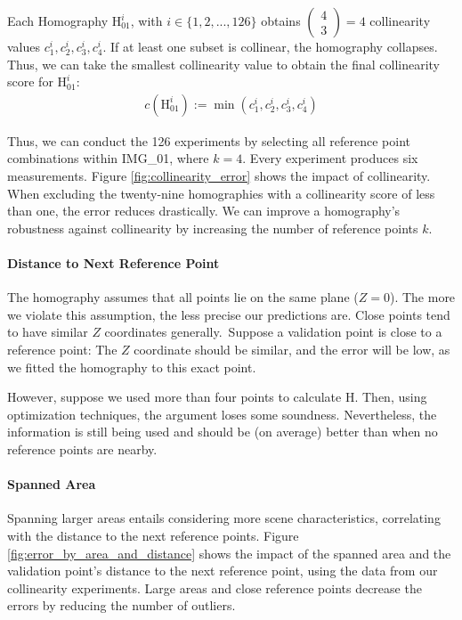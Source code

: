 Each Homography $\mathrm{H}_{01}^i$, with $i \in \{ 1, 2, ..., 126 \}$ 
obtains $\begin{pmatrix} 4 \\ 3 \end{pmatrix} = 4$ collinearity values $c_1^i, c_2^i, c_3^i, c_4^i$.
If at least one subset is collinear, the homography collapses. 
Thus, we can take the smallest collinearity value to obtain the 
final collinearity score for $\mathrm{H}_{01}^i$:
\begin{equation}
\begin{aligned}
	c(\mathrm{H}_{01}^i) := \min{(c_1^i, c_2^i, c_3^i, c_4^i)}
\end{aligned}
\end{equation}

Thus, we can conduct the 126 experiments by selecting all reference point 
combinations within IMG\_01, where $k=4$. Every experiment produces 
six measurements. Figure \ref{fig:collinearity_error} shows the 
impact of collinearity. When excluding the twenty-nine homographies with a 
collinearity score of less than one, the error reduces drastically. 
We can improve a homography's robustness against collinearity by 
increasing the number of reference points $k$.

\paragraph{Distance to Next Reference Point}
The homography assumes that all points lie on the same plane ($Z=0$). The 
more we violate this assumption, the less precise our predictions are. 
Close points tend to have similar $Z$ coordinates generally. Suppose a 
validation point is close to a reference point: The $Z$ coordinate should be 
similar, and the error will be low, as we fitted the homography to 
this exact point.

However, suppose we used more than four points to calculate $\mathrm{H}$. 
Then, using optimization techniques, the argument loses some soundness. 
Nevertheless, the information is still being used and should be 
(on average) better than when no reference points are nearby.

\paragraph{Spanned Area}
Spanning larger areas entails considering more scene characteristics, 
correlating with the distance to the next reference points. 
Figure \ref{fig:error_by_area_and_distance} shows the impact of the 
spanned area and the validation point's distance to the next 
reference point, using the data from our collinearity experiments.
Large areas and close reference points decrease the 
errors by reducing the number of outliers.

